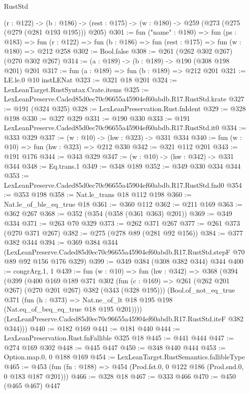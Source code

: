 \begin{lexlean}{RustStd}
\begin{coremodule}
  (r : @122) ->
  (b : @186) -> (rest : @175) -> (w : @180) -> @259 (@273 (@275 (@279 (@281 @193 @195))) @205)
@301 := fun ("name" : @180) =>
  fun (ps : @183) =>
  fun (r : @122) => fun (b : @186) => fun (rest : @175) => fun (w : @180) => @212 @258
@302 := Bool.false
@308 := @261 (@262 @302 @267) (@270 @302 @267)
@314 := (a : @189) -> (b : @189) -> @190 (@308 @198 @201) @201
@317 := fun (a : @189) => fun (b : @189) => @212 @201
@321 := LE.le.{0} @10 instLENat
@323 := @321 @18 @201
@324 := LexLeanTarget.RustSyntax.Crate.items
@325 := LexLeanPreserve.Caded85d0ec70c96655a45904ef60abdb.R17.RustStd.krate
@327 := @191 (@324 @325)
@328 := LexLeanPreservation.Rust.fnIdent
@329 := @328 @198
@330 := @327 @329
@331 := @190 @330
@333 := @191 LexLeanPreserve.Caded85d0ec70c96655a45904ef60abdb.R17.RustStd.it0
@334 := @333 @329
@337 := (w : @10) -> (hw : @323) -> @331 @334
@340 := fun (w : @10) => fun (hw : @323) => @212 @330
@342 := @321 @112 @201
@343 := @191 @176
@344 := @343 @329
@347 := (w : @10) -> (hw : @342) -> @331 @344
@348 := Eq.trans.{1}
@349 := @348 @189
@352 := @349 @330 @334 @344
@353 := LexLeanPreserve.Caded85d0ec70c96655a45904ef60abdb.R17.RustStd.fnd0
@354 := @353 @198
@358 := Nat.le_trans @18 @112 @198
@360 := Nat.le_of_ble_eq_true @18
@361 := @360 @112
@362 := @211 @169
@363 := @362 @267
@368 := @352 (@354 (@358 (@361 @363) @201))
@369 := @349 @334
@371 := @263 @70 @329
@373 := @262 @371 @267
@377 := @261 @373 (@270 @371 @267)
@382 := @275 (@278 @89 (@281 @92 @156))
@384 := @377 @382 @344
@394 := @369
    @384
    @344
    (LexLeanPreserve.Caded85d0ec70c96655a45904ef60abdb.R17.RustStd.stepF @70 @89 @92 @156 @176 @329)
@399 := @349 @384 (@308 @382 @344) @344
@400 := congrArg.{1, 1}
@439 := fun (w : @10) =>
  fun (hw : @342) =>
  @368
    (@394
      (@399
        (@400
          @169
          @189
          @371
          @302
          (fun (c : @169) => @261 (@262 @201 @267) (@270 @201 @267) @382 (@343 (@328 @195)))
          (Bool.of_not_eq_true
            @371
            (fun (h : @373) => Nat.ne_of_lt @18 @195 @198 (Nat.eq_of_beq_eq_true @18 @195 @201))))
        (LexLeanPreserve.Caded85d0ec70c96655a45904ef60abdb.R17.RustStd.iteF @382 @344)))
@440 := @182 @169
@441 := @181 @440
@444 := LexLeanPreservation.Rust.fnFallible @325 @18
@445 := @441 @444
@447 := @274 @169 @302
@448 := @445 @447
@450 := @348 @440 @444
@453 := Option.map.{0, 0} @188 @169
@454 := LexLeanTarget.RustSemantics.fallibleType
@465 := @453 (fun (fn : @188) => @454 (Prod.fst.{0, 0} @122 @186 (Prod.snd.{0, 0} @183 @187 @201)))
@466 := @328 @18
@467 := @333 @466
@470 := @450 (@465 @467) @447

\end{coremodule}
\end{lexlean}
